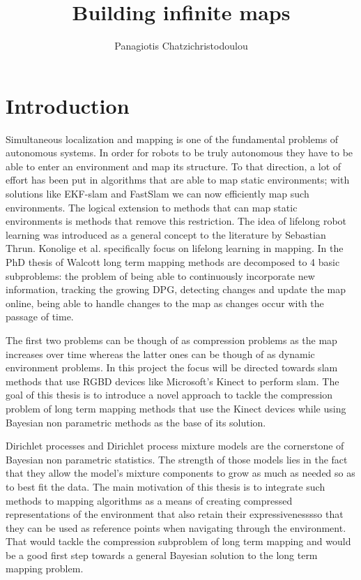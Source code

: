 \documentclass[]{article}
\title{\vspace{-0.0cm}Building infinite maps}
\author{Panagiotis Chatzichristodoulou}
\date{}
\begin{document}
\maketitle %


\section{Introduction}

Simultaneous localization and mapping is one of the fundamental problems of autonomous systems\cite{probRobs}. In order for robots to be truly autonomous they have to be able to enter an environment and map its structure. To that direction, a lot of effort has been put in algorithms that are able to map static environments; with solutions like EKF-slam\cite{ekf} and FastSlam\cite{slam} we can now efficiently map such environments. 
The logical extension to methods that can map static environments is methods that remove this restriction. The idea of lifelong robot learning was introduced as a general concept to the literature by Sebastian Thrun\cite{liflonglearning}. Konolige et al.\cite{lifelongmaps} specifically focus on lifelong learning in mapping. In the PhD thesis of Walcott\cite{aishalong} long term mapping methods are decomposed to 4 basic subproblems: the problem of being able to continuously incorporate new information, tracking the growing DPG, detecting changes and update the map online, being able to handle changes to the map as changes occur with the passage of time.

The first two problems can be though of as compression problems as the map increases over time whereas the latter ones can be though of as dynamic environment problems. In this project the focus will be directed towards slam methods that use RGBD devices like Microsoft's Kinect to perform slam. The goal of this thesis is to introduce a novel approach to tackle the compression problem of long term mapping methods that use the Kinect devices while using Bayesian non parametric methods as the base of its solution.

Dirichlet processes and Dirichlet process mixture models\cite{nonParam} are the cornerstone of Bayesian non parametric statistics. The strength of those models lies in the fact that they allow the model's mixture components to grow as much as needed so as to best fit the data. The main motivation of this thesis is to integrate such methods to mapping algorithms as a means of creating compressed representations of the environment that also retain their expressivenesssso that they can be used as reference points when navigating through the environment. That would tackle the compression subproblem of long term mapping and would be a good first step towards a general Bayesian solution to the long term mapping problem.
\end{document}
